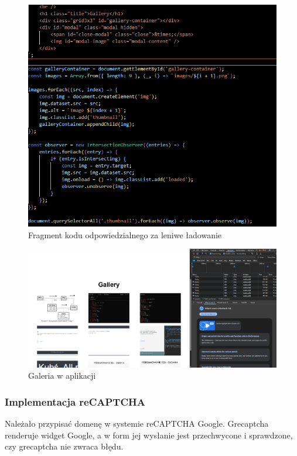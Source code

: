 \documentclass[a4paper,12pt]{article}
\begin{document}
\begin{figure}[H]
    \centering
    \includegraphics[width=1\textwidth]{images/lazy.png}
    \caption{Fragment kodu odpowiedzialnego za leniwe ładowanie}
\end{figure}

\begin{figure}[H]
    \centering
    \includegraphics[width=1\textwidth]{images/gallery.png}
    \caption{Galeria w aplikacji}
    \label{fig:gallery}
\end{figure}

\subsubsection{Implementacja reCAPTCHA}

Należało przypisać domenę w systemie reCAPTCHA Google. Grecaptcha renderuje widget Google, a w form jej wysłanie jest przechwycone i sprawdzone, czy grecaptcha nie zwraca błędu.
\end{document}

